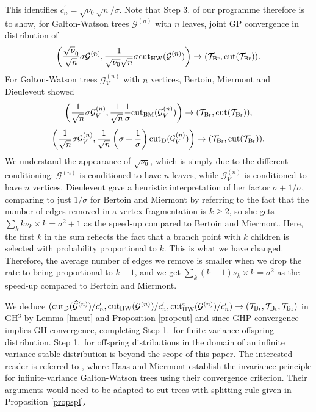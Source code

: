 \documentclass[11pt,a4paper]{article}
\newcommand{\cG}{\mathcal{G}}
\newcommand{\cT}{\mathcal{T}}
\newcommand{\modcut}{{\rm cut}_{\rm HW}}
\newcommand{\ourcut}{{\rm cut}_{\rm HW}^\circ}
\begin{document}
This identifies $c_n^\prime=\sqrt{\nu_0}\sqrt{n}/\sigma$. Note that Step 3. of our programme therefore is to show, for Galton-Watson trees $\cG^{(n)}$ with 
$n$ leaves, joint GP convergence in distribution of \vspace{-0.2cm}
$$\left(\frac{\sqrt{\nu}_0}{\sqrt{n}}\sigma\cG^{(n)},\frac{1}{\sqrt{\nu_0}\sqrt{n}}\sigma\modcut(\cG^{(n)})\right)\rightarrow(\cT_{\rm Br},{\rm cut}(\cT_{\rm Br})).\vspace{-0.2cm}$$
For Galton-Watson trees $\cG^{(n)}_V$ with $n$ vertices, Bertoin, Miermont and Dieuleveut showed\vspace{-0.2cm}
$$\left(\frac{1}{\sqrt{n}}\sigma\cG^{(n)}_V,\frac{1}{\sqrt{n}}\frac{1}{\sigma}{\rm cut}_{\rm BM}(\cG^{(n)}_V)\right)\rightarrow(\cT_{\rm Br},{\rm cut}(\cT_{\rm Br})),\vspace{-0.1cm}$$
$$\left(\frac{1}{\sqrt{n}}\sigma\cG^{(n)}_V,\frac{1}{\sqrt{n}}\left(\sigma+\frac{1}{\sigma}\right){\rm cut}_{\rm D}(\cG^{(n)}_V)\right)\rightarrow(\cT_{\rm Br},{\rm cut}(\cT_{\rm Br})).$$
We understand the appearance of $\sqrt{\nu_0}$, which is simply due to the different conditioning: $\cG^{(n)}$ is conditioned to have $n$ leaves, while $\cG^{(n)}_V$ is conditioned to have $n$ vertices. Dieuleveut gave a heuristic interpretation of her factor $\sigma+1/\sigma$, comparing to just $1/\sigma$ for Bertoin and Miermont by referring to the fact that the number of edges removed in a vertex fragmentation is $k\ge 2$, so she gets $\sum_kk\nu_k\times k=\sigma^2+1$ as the speed-up compared to Bertoin and Miermont. Here, the first $k$ in the sum reflects the fact that a branch point with $k$ children is selected with probability proportional to $k$. This is what
we have changed. Therefore, the average number of edges we remove is smaller when we drop the rate to being proportional to $k-1$, and we get $\sum_k(k-1)\nu_k\times k=\sigma^2$ as the speed-up compared to Bertoin and Miermont.

We deduce  $({\rm cut}_{\rm D}(\widehat{\cG}^{(n)})/c_n^\prime,\modcut(\cG^{(n)})/c_n^\prime,\ourcut(\cG^{(n)})/c_n^\prime)\rightarrow(\cT_{\rm Br},\cT_{\rm Br},\cT_{\rm Br})$ in GH$^3$ by Lemma \ref{lmcut} and Proposition \ref{propcut} and since GHP convergence implies GH convergence, completing Step 1.\ for finite variance offspring distribution. Step 1.\ for offspring distributions in the domain of an infinite variance stable distribution is beyond the scope of this paper. The interested reader is referred to 
\cite[Section 5.2]{HM10}, where Haas and Miermont establish the invariance principle for infinite-variance Galton-Watson trees using their convergence criterion. Their 
arguments would need to be adapted to cut-trees with splitting rule given in Proposition \ref{propspl}.  
\end{document}
